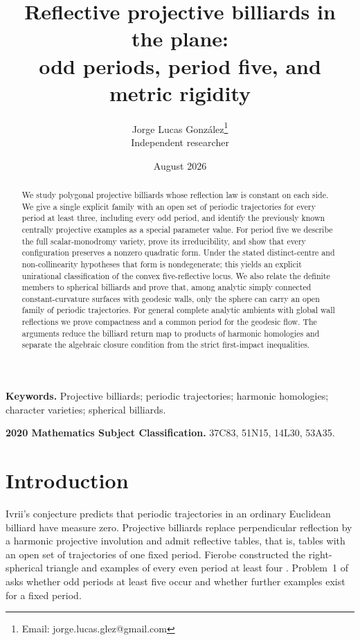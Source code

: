 \documentclass[11pt,a4paper]{article}
\title{Reflective projective billiards in the plane:\\
odd periods, period five, and metric rigidity}
\author{Jorge Lucas Gonz\'alez\thanks{Email: jorge.lucas.glez@gmail.com}\\
\small Independent researcher}
\date{August 2026}
\theoremstyle{plain}
\theoremstyle{definition}
\theoremstyle{remark}
\begin{document}
\maketitle
\begin{abstract}
We study polygonal projective billiards whose reflection law is constant on each
side.  We give a single explicit family with an open set of periodic trajectories
for every period at least three, including every odd period, and identify the
previously known centrally projective examples as a special parameter value.  For
period five we describe the full scalar-monodromy variety, prove its irreducibility,
and show that every configuration preserves a nonzero quadratic form. Under
the stated distinct-centre and non-collinearity hypotheses that form is
nondegenerate; this yields an
explicit unirational classification of the convex five-reflective locus.  We also
relate the definite members to spherical billiards and prove that, among analytic
simply connected constant-curvature surfaces with geodesic walls, only the
sphere can carry an open family of periodic trajectories. For general complete
analytic ambients with global wall reflections we prove compactness and a
common period for the geodesic flow.  The arguments reduce the billiard return
map to products of harmonic homologies and separate the algebraic closure condition
from the strict first-impact inequalities.
\end{abstract}

\noindent\textbf{Keywords.} Projective billiards; periodic trajectories; harmonic
homologies; character varieties; spherical billiards.

\medskip
\noindent\textbf{2020 Mathematics Subject Classification.}
37C83, 51N15, 14L30, 53A35.

\section{Introduction}
Ivrii's conjecture \cite{ivrii} predicts that periodic trajectories in an ordinary Euclidean
billiard have measure zero.  Projective billiards replace perpendicular reflection
by a harmonic projective involution and admit reflective tables, that is, tables
with an open set of trajectories of one fixed period.  Fierobe constructed the
right-spherical triangle and examples of every even period at least four
\cite{fie-ex,fie-tri}.  Problem~1 of \cite{opb} asks whether odd periods at least
five occur and whether further examples exist for a fixed period.
\end{document}
